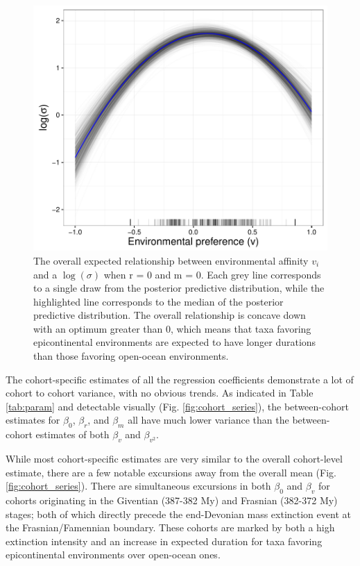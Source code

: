 \documentclass{article}
\begin{document}
\begin{figure}[ht]
  \centering
  \includegraphics[height = 0.5\textheight,width=\textwidth,keepaspectratio=true]{figure/env_effect}
  \caption{The overall expected relationship between environmental affinity \(v_{i}\) and a \(\log(\sigma)\) when r = 0 and m = 0. Each grey line corresponds to a single draw from the posterior predictive distribution, while the highlighted line corresponds to the median of the posterior predictive distribution. The overall relationship is concave down with an optimum greater than 0, which means that taxa favoring epicontinental environments are expected to have longer durations than those favoring open-ocean environments.}
  \label{fig:env_mean}
\end{figure}



The cohort-specific estimates of all the regression coefficients demonstrate a lot of cohort to cohort variance, with no obvious trends. As indicated in Table \ref{tab:param} and detectable visually (Fig. \ref{fig:cohort_series}), the between-cohort estimates for \(\beta_{0}\), \(\beta_{r}\), and \(\beta_{m}\) all have much lower variance than the between-cohort estimates of both \(\beta_{v}\) and \(\beta_{v^{2}}\).

While most cohort-specific estimates are very similar to the overall cohort-level estimate, there are a few notable excursions away from the overall mean (Fig. \ref{fig:cohort_series}). There are simultaneous excursions in both \(\beta_{0}\) and \(\beta_{v}\) for cohorts originating in the Giventian (387-382 My) and Frasnian (382-372 My) stages; both of which directly precede the end-Devonian mass extinction event at the Frasnian/Famennian boundary. These cohorts are marked by both a high extinction intensity and an increase in expected duration for taxa favoring epicontinental environments over open-ocean ones.
\end{document}
